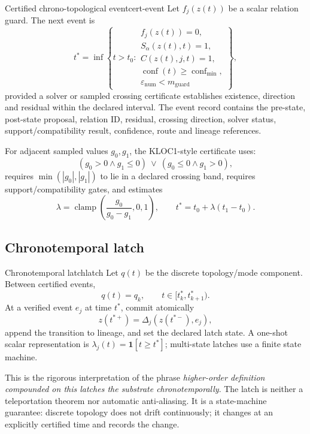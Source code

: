 \documentclass[10pt,a4paper]{article}
\begin{document}
\begin{formaldef}{Certified chrono-topological event}{cert-event}
Let \(f_j(z(t))\) be a scalar relation guard. The next event is
\[
t^*=\inf\left\{t>t_0:
\begin{array}{l}
 f_j(z(t))=0,\\
 S_\alpha(z(t),t)=1,\\
 C(z(t),j,t)=1,\\
 \operatorname{conf}(t)\ge\operatorname{conf}_{\min},\\
 \varepsilon_{\mathrm{num}}<m_{\mathrm{guard}}
\end{array}
\right\},
\]
provided a solver or sampled crossing certificate establishes existence, direction and residual within the declared interval. The event record contains the pre-state, post-state proposal, relation ID, residual, crossing direction, solver status, support/compatibility result, confidence, route and lineage references.
\end{formaldef}

For adjacent sampled values \(g_0,g_1\), the KLOC1-style certificate uses:
\[
(g_0>0\wedge g_1\le0)\ \vee\ (g_0\le0\wedge g_1>0),
\]
requires \(\min(|g_0|,|g_1|)\) to lie in a declared crossing band, requires support/compatibility gates, and estimates
\[
\lambda=\operatorname{clamp}\!\left(\frac{g_0}{g_0-g_1},0,1\right),
\qquad t^*=t_0+\lambda(t_1-t_0).
\]

\subsection{Chronotemporal latch}

\begin{formaldef}{Chronotemporal latch}{latch}
Let \(q(t)\) be the discrete topology/mode component. Between certified events,
\[
q(t)=q_k,\qquad t\in[t_k^*,t_{k+1}^*).
\]
At a verified event \(e_j\) at time \(t^*\), commit atomically
\[
z(t^{*+})=\Delta_j(z(t^{*-}),e_j),
\]
append the transition to lineage, and set the declared latch state. A one-shot scalar representation is \(\lambda_j(t)=\mathbf 1[t\ge t^*]\); multi-state latches use a finite state machine.
\end{formaldef}

This is the rigorous interpretation of the phrase \emph{higher-order definition compounded on this latches the substrate chronotemporally}. The latch is neither a teleportation theorem nor automatic anti-aliasing. It is a state-machine guarantee: discrete topology does not drift continuously; it changes at an explicitly certified time and records the change.
\end{document}

